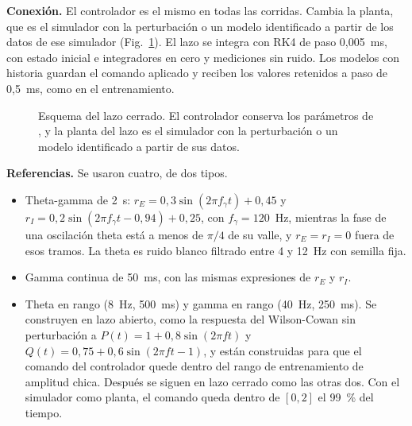 \documentclass[11pt,a4paper]{article}
\begin{document}
\textbf{Conexión.} El controlador es el mismo en todas las corridas. Cambia la planta, que es el simulador con la perturbación o un modelo identificado a partir de los datos de ese simulador (Fig.~\ref{fig:lazo}). El lazo se integra con RK4 de paso 0,005~ms, con estado inicial e integradores en cero y mediciones sin ruido. Los modelos con historia guardan el comando aplicado y reciben los valores retenidos a paso de 0,5~ms, como en el entrenamiento.

\begin{figure}[H]
\centering
{}
\caption{Esquema del lazo cerrado. El controlador conserva los parámetros de \cite{martinez2022ifac}, y la planta del lazo es el simulador con la perturbación o un modelo identificado a partir de sus datos.}
\label{fig:lazo}
\end{figure}

\textbf{Referencias.} Se usaron cuatro, de dos tipos.

\begin{itemize}[leftmargin=*,itemsep=0.15em]
\item Theta-gamma de 2~s: $r_E = 0{,}3\sin(2\pi f_\gamma t) + 0{,}45$ y $r_I = 0{,}2\sin(2\pi f_\gamma t - 0{,}94) + 0{,}25$, con $f_\gamma = 120$~Hz, mientras la fase de una oscilación theta está a menos de $\pi/4$ de su valle, y $r_E = r_I = 0$ fuera de esos tramos. La theta es ruido blanco filtrado entre 4 y 12~Hz con semilla fija.
\item Gamma continua de 50~ms, con las mismas expresiones de $r_E$ y $r_I$.
\item Theta en rango (8~Hz, 500~ms) y gamma en rango (40~Hz, 250~ms). Se construyen en lazo abierto, como la respuesta del Wilson-Cowan sin perturbación a $P(t) = 1 + 0{,}8\sin(2\pi f t)$ y $Q(t) = 0{,}75 + 0{,}6\sin(2\pi f t - 1)$, y están construidas para que el comando del controlador quede dentro del rango de entrenamiento de amplitud chica. Después se siguen en lazo cerrado como las otras dos. Con el simulador como planta, el comando queda dentro de $[0, 2]$ el 99~\% del tiempo.
\end{itemize}
\end{document}
